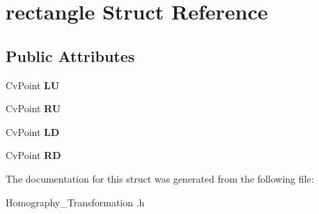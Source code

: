 \hypertarget{structrectangle}{\section{rectangle Struct Reference}
\label{structrectangle}
}
\subsection*{Public Attributes}
\begin{DoxyCompactItemize}
\item 
\hypertarget{structrectangle_a20165b9c872eea25d4956e6fa8ee01e1}{Cv\-Point {\bfseries L\-U}}\label{structrectangle_a20165b9c872eea25d4956e6fa8ee01e1}

\item 
\hypertarget{structrectangle_a803e136afbe00e5029aaf6fa75551c2f}{Cv\-Point {\bfseries R\-U}}\label{structrectangle_a803e136afbe00e5029aaf6fa75551c2f}

\item 
\hypertarget{structrectangle_a96fb25c509c77f0e8de68c5cba94225c}{Cv\-Point {\bfseries L\-D}}\label{structrectangle_a96fb25c509c77f0e8de68c5cba94225c}

\item 
\hypertarget{structrectangle_a017fb4b6c624f3abf0c3d5255edbe9e0}{Cv\-Point {\bfseries R\-D}}\label{structrectangle_a017fb4b6c624f3abf0c3d5255edbe9e0}

\end{DoxyCompactItemize}


The documentation for this struct was generated from the following file\-:\begin{DoxyCompactItemize}
\item 
Homography\-\_\-\-Transformation .\-h\end{DoxyCompactItemize}
